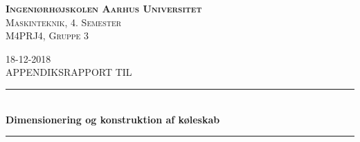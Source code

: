 \documentclass[../Hovedrapport.tex]{subfiles}
\begin{document}
\thispagestyle{empty}
    \newcommand{\HRule}{\rule{\linewidth}{0.5mm}}
    \center %
    \textsc{\LARGE \textbf{Ingeniørhøjskolen Aarhus Universitet}}   \\  [0.5cm]
    \textsc{\Large Maskinteknik, 4. Semester}                       \\  [0.5cm]
    \textsc{\large M4PRJ4, Gruppe 3}                                \\  [0.5cm]
        \date{18-12-2018}
    {\large 18-12-2018}                                             \\  [0.5cm]
    \textsc{\LARGE APPENDIKSRAPPORT TIL}\\[0.5cm]
    \HRule \\[0.4cm]
    \textbf{{\huge Dimensionering og konstruktion af køleskab}}\\[0.1cm]
    \HRule \\[0.001cm]
    
\end{document}
